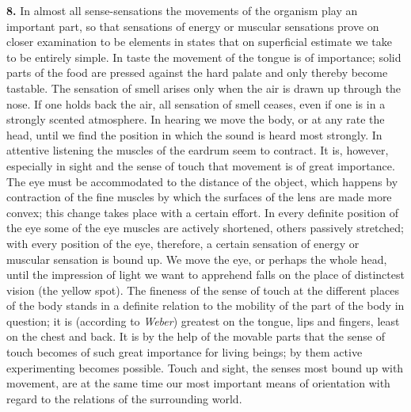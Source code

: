 \documentclass[12pt,a4paper]{book}
\newcommand{\opage}[1]{\marginnote{\footnotesize\textit{[#1]}}}
\begin{document}
\textbf{8.} In almost all sense-sensations the movements of the
organism play an important part, so that sensations of energy or
muscular sensations prove on closer examination to be elements in
states that on superficial estimate we take to be entirely simple. In
taste the movement of the tongue is of importance; solid parts of the
food are pressed against the hard palate and only thereby become
tastable. The sensation of smell arises only when the air is drawn up
through the nose. If one holds back the air, all sensation of smell
ceases, even if one is in a strongly scented atmosphere. In hearing we
move the body, or at any rate the head, until we find the position in
which the sound is heard most strongly. In attentive listening the
muscles of the eardrum seem to contract. It is, however, especially in
sight and the sense of touch that movement is of great importance. The
eye must be accommodated to the distance of the object, which happens by
contraction of the fine muscles by which the surfaces of the lens are
made more convex; this change takes place with a certain effort. In
every definite position of the eye some of the eye muscles are actively
shortened, others passively stretched; with
\opage{148}every position of the eye, therefore, a certain sensation of
energy or muscular sensation is bound up. We move the eye, or perhaps
the whole head, until the impression of light we want to apprehend falls
on the place of distinctest vision (the yellow spot). The fineness of
the sense of touch at the different places of the body stands in a
definite relation to the mobility of the part of the body in question;
it is (according to \emph{Weber}) greatest on the tongue, lips and
fingers, least on the chest and back. It is by the help of the movable
parts that the sense of touch becomes of such great importance for
living beings; by them active experimenting becomes possible. Touch and
sight, the senses most bound up with movement, are at the same time our
most important means of orientation with regard to the relations of the
surrounding world.
\end{document}
